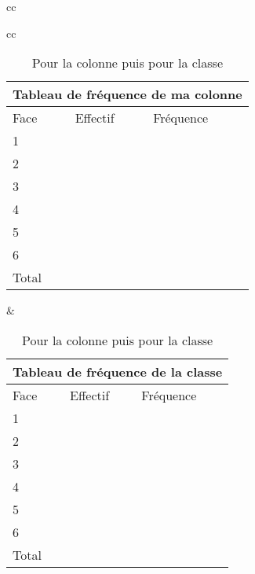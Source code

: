 \begin{act}
\begin{table}[h]
\begin{tabular}{cc}
 \\
\end{tabular}

\vfill

		\caption{Pour la colonne puis pour la classe}\label{fluctu2}

\begin{tabular}{cc}

		\begin{tabular}{|*{3}{m{2cm}|}}
			\multicolumn{3}{m{6cm}}{\centering Tableau de fr\'equence de ma colonne} \tabularnewline \hline
			Face & Effectif & Fr\'equence \\ \hline
			1 & & \\ \hline
			2 & & \\ \hline
			3 & & \\ \hline
			4 & & \\ \hline
			5 & & \\ \hline
			6 & & \\ \hline
			Total & & \\ \hline
		\end{tabular}

&

		\begin{tabular}{|*{3}{m{2cm}|}}
			\multicolumn{3}{m{6cm}}{\centering Tableau de fr\'equence de la classe} \tabularnewline \hline
			Face & Effectif & Fr\'equence \\ \hline
			1 & & \\ \hline
			2 & & \\ \hline
			3 & & \\ \hline
			4 & & \\ \hline
			5 & & \\ \hline
			6 & & \\ \hline
			Total & & \\ \hline
		\end{tabular}
\\
\end{tabular}
\end{table}


\end{act}
